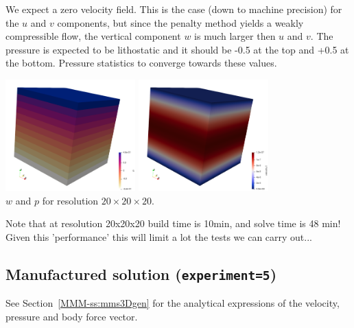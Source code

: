 We expect a zero velocity field. This is the case (down to machine precision) 
for the $u$ and $v$ components, but since the penalty method yields a 
weakly compressible flow, the vertical component $w$ is much larger 
then $u$ and $v$.
The pressure is expected to be lithostatic and it should be -0.5 at the top 
and +0.5 at the bottom. Pressure statistics to converge towards these values. 

\begin{center}
\includegraphics[width=5cm]{python_codes/fieldstone_10/resultsQ2/exp0/press}
\includegraphics[width=5cm]{python_codes/fieldstone_10/resultsQ2/exp0/w}\\
{\captionfont $w$ and $p$ for resolution $20\times 20 \times 20$.}
\end{center}

Note that at resolution 20x20x20 build time is 10min, and solve time is 48 min!
Given this 'performance' this will limit a lot the tests we can carry out...

\subsection*{Manufactured solution ({\tt experiment=5})}

See Section~\ref{MMM-ss:mms3Dgen} for the analytical expressions 
of the velocity, pressure and body force vector.

